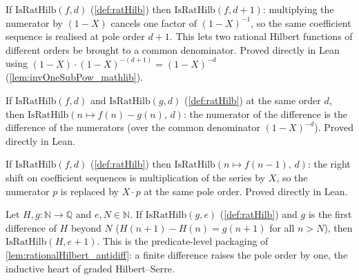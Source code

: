 \begin{lemma}
  \label{lem:ratHilb_bump}
  If \(\mathrm{IsRatHilb}(f, d)\) (\cref{def:ratHilb}) then
  \(\mathrm{IsRatHilb}(f, d+1)\): multiplying the numerator by \((1-X)\) cancels
  one factor of \((1-X)^{-1}\), so the same coefficient sequence is realised at
  pole order \(d+1\). This lets two rational Hilbert functions of different
  orders be brought to a common denominator. Proved directly in Lean using
  \((1-X)\cdot(1-X)^{-(d+1)} = (1-X)^{-d}\) (\cref{lem:invOneSubPow_mathlib}).
\end{lemma}

\begin{lemma}
  \label{lem:ratHilb_sub}
  If \(\mathrm{IsRatHilb}(f, d)\) and \(\mathrm{IsRatHilb}(g, d)\)
  (\cref{def:ratHilb}) at the same order \(d\), then
  \(\mathrm{IsRatHilb}(n \mapsto f(n) - g(n),\, d)\): the numerator of the
  difference is the difference of the numerators (over the common denominator
  \((1-X)^{-d}\)). Proved directly in Lean.
\end{lemma}

\begin{lemma}
  \label{lem:ratHilb_shiftRight}
  If \(\mathrm{IsRatHilb}(f, d)\) (\cref{def:ratHilb}) then
  \(\mathrm{IsRatHilb}(n \mapsto f(n-1),\, d)\): the right shift on coefficient
  sequences is multiplication of the series by \(X\), so the numerator
  \(p\) is replaced by \(X\cdot p\) at the same pole order. Proved directly in
  Lean.
\end{lemma}

\begin{lemma}
  \label{lem:ratHilb_antidiff}
  Let \(H, g : \mathbb{N} \to \mathbb{Q}\) and \(e, N \in \mathbb{N}\). If
  \(\mathrm{IsRatHilb}(g, e)\) (\cref{def:ratHilb}) and \(g\) is the first
  difference of \(H\) beyond \(N\) (\(H(n+1) - H(n) = g(n+1)\) for all
  \(n > N\)), then \(\mathrm{IsRatHilb}(H, e+1)\). This is the predicate-level
  packaging of \cref{lem:rationalHilbert_antidiff}: a finite difference raises
  the pole order by one, the inductive heart of graded Hilbert--Serre.
\end{lemma}

